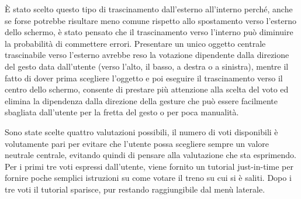 È stato scelto questo tipo di trascinamento dall'esterno all'interno perché, anche se forse potrebbe risultare meno comune rispetto allo spostamento verso l'esterno dello schermo, è stato pensato che il trascinamento verso l'interno può diminuire la probabilità di commettere errori. Presentare un unico oggetto centrale trascinabile verso l'esterno avrebbe reso la votazione dipendente dalla direzione del gesto data dall'utente (verso l'alto, il basso, a destra o a sinistra), mentre il fatto di dover prima scegliere l'oggetto e poi eseguire il trascinamento verso il centro dello schermo, consente di prestare più attenzione alla scelta del voto ed elimina la dipendenza dalla direzione della gesture che può essere facilmente sbagliata dall'utente per la fretta del gesto o per poca manualità. 

Sono state scelte quattro valutazioni possibili, il numero di voti disponibili è volutamente pari per evitare che l'utente possa scegliere sempre un valore neutrale centrale, evitando quindi di pensare alla valutazione che sta esprimendo. 
Per i primi tre voti espressi dall'utente, viene fornito un tutorial just-in-time per fornire poche semplici istruzioni su come votare il treno su cui si è saliti.
Dopo i tre voti il tutorial sparisce, pur restando raggiungibile dal menù laterale.

